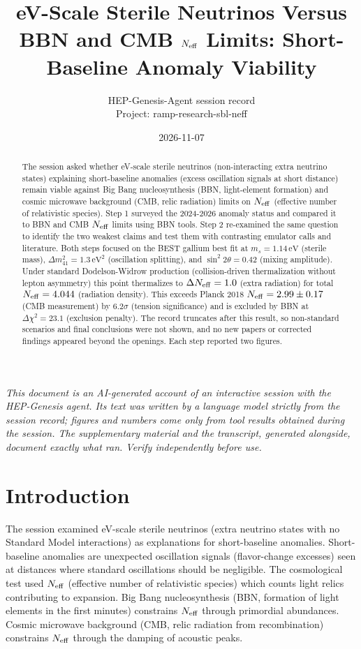 \documentclass[11pt,a4paper]{article}
\title{eV-Scale Sterile Neutrinos Versus BBN and CMB $N_{\rm eff}$ Limits: Short-Baseline Anomaly Viability}
\author{HEP-Genesis-Agent session record \\ \small Project: ramp-research-sbl-neff}
\date{2026-11-07}
\begin{document}
\maketitle
\noindent\textit{\small This document is an AI-generated account of an interactive session with the HEP-Genesis agent. Its text was written by a language model strictly from the session record; figures and numbers come only from tool results obtained during the session. The supplementary material and the transcript, generated alongside, document exactly what ran. Verify independently before use.}
\vspace{1em}

\begin{abstract}
The session asked whether eV-scale sterile neutrinos (non-interacting extra neutrino states) explaining short-baseline anomalies (excess oscillation signals at short distance) remain viable against Big Bang nucleosynthesis (BBN, light-element formation) and cosmic microwave background (CMB, relic radiation) limits on $N_{\rm eff}$ (effective number of relativistic species). Step 1 surveyed the 2024-2026 anomaly status and compared it to BBN and CMB $N_{\rm eff}$ limits using BBN tools. Step 2 re-examined the same question to identify the two weakest claims and test them with contrasting emulator calls and literature. Both steps focused on the BEST gallium best fit at $m_s = 1.14\,\mathrm{eV}$ (sterile mass), $\Delta m^2_{41} = 1.3\,\mathrm{eV}^2$ (oscillation splitting), and $\sin^2 2\theta = 0.42$ (mixing amplitude). Under standard Dodelson-Widrow production (collision-driven thermalization without lepton asymmetry) this point thermalizes to $\Delta N_{\rm eff} = 1.0$ (extra radiation) for total $N_{\rm eff} = 4.044$ (radiation density). This exceeds Planck 2018 $N_{\rm eff} = 2.99 \pm 0.17$ (CMB measurement) by $6.2\sigma$ (tension significance) and is excluded by BBN at $\Delta \chi^2 = 23.1$ (exclusion penalty). The record truncates after this result, so non-standard scenarios and final conclusions were not shown, and no new papers or corrected findings appeared beyond the openings. Each step reported two figures.
\end{abstract}
\section{Introduction}
The session examined eV-scale sterile neutrinos (extra neutrino states with no Standard Model interactions) as explanations for short-baseline anomalies. Short-baseline anomalies are unexpected oscillation signals (flavor-change excesses) seen at distances where standard oscillations should be negligible. The cosmological test used $N_{\rm eff}$ (effective number of relativistic species) which counts light relics contributing to expansion. Big Bang nucleosynthesis (BBN, formation of light elements in the first minutes) constrains $N_{\rm eff}$ through primordial abundances. Cosmic microwave background (CMB, relic radiation from recombination) constrains $N_{\rm eff}$ through the damping of acoustic peaks.
\end{document}
